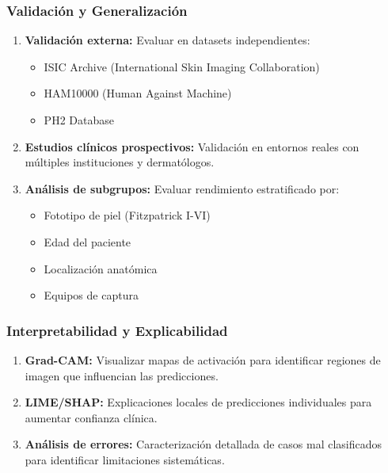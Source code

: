 \documentclass[11pt, a4paper]{article}
\begin{document}
\subsubsection{Validación y Generalización}

\begin{enumerate}
    \item \textbf{Validación externa:} Evaluar en datasets independientes:
    \begin{itemize}
        \item ISIC Archive (International Skin Imaging Collaboration)
        \item HAM10000 (Human Against Machine)
        \item PH2 Database
    \end{itemize}
    
    \item \textbf{Estudios clínicos prospectivos:} Validación en entornos reales con múltiples instituciones y dermatólogos.
    
    \item \textbf{Análisis de subgrupos:} Evaluar rendimiento estratificado por:
    \begin{itemize}
        \item Fototipo de piel (Fitzpatrick I-VI)
        \item Edad del paciente
        \item Localización anatómica
        \item Equipos de captura
    \end{itemize}
\end{enumerate}

\subsubsection{Interpretabilidad y Explicabilidad}

\begin{enumerate}
    \item \textbf{Grad-CAM:} Visualizar mapas de activación para identificar regiones de imagen que influencian las predicciones.
    
    \item \textbf{LIME/SHAP:} Explicaciones locales de predicciones individuales para aumentar confianza clínica.
    
    \item \textbf{Análisis de errores:} Caracterización detallada de casos mal clasificados para identificar limitaciones sistemáticas.
\end{enumerate}
\end{document}
